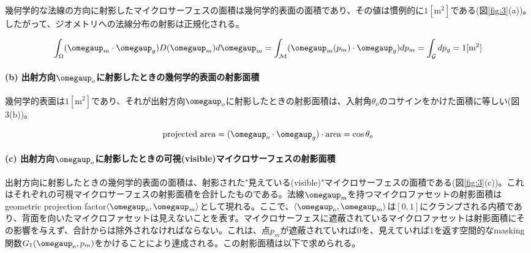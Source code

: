 \documentclass[a4paper,xelatex,ja=standard]{bxjsarticle}
\begin{document}
幾何学的な法線の方向に射影したマイクロサーフェスの面積は幾何学的表面の面積であり、その値は慣例的に$1 [\text{m}^2]$である(図\ref{fig:3}(a))。したがって、ジオメトリへの法線分布の射影は正規化される。

\begin{equation}
    \int_\Omega (\boldsymbol{\omegaup}_m \cdot \boldsymbol{\omegaup}_g) D(\boldsymbol{\omegaup}_m) d\boldsymbol{\omegaup}_m = \int_\mathcal{M} (\boldsymbol{\omegaup}_m(p_m) \cdot \boldsymbol{\omegaup}_g) dp_m = \int_\mathcal{G} dp_g = 1 [\text{m}^2]
    \label{eq:9}
\end{equation}

\paragraph{(b) 出射方向$\boldsymbol{\omegaup}_o$に射影したときの幾何学的表面の射影面積}

幾何学的表面は$1 [\text{m}^2]$であり、それが出射方向$\boldsymbol{\omegaup}_o$に射影したときの射影面積は、入射角$\theta_o$のコサインをかけた面積に等しい(図3(b))。

\begin{equation}
    \text{projected area} = (\boldsymbol{\omegaup}_o \cdot \boldsymbol{\omegaup}_g) \cdot \text{area} = \cos \theta_o
    \label{eq:10}
\end{equation}

\paragraph{(c) 出射方向$\boldsymbol{\omegaup}_o$に射影したときの可視(visible)マイクロサーフェスの射影面積}

出射方向に射影したときの幾何学的表面の面積は、射影された"見えている(visible)"マイクロサーフェスの面積である(図\ref{fig:3}(c))。これはそれぞれの可視マイクロサーフェスの射影面積を合計したものである。法線$\boldsymbol{\omegaup}_m$を持つマイクロファセットの射影面積はgeometric projection factor$\langle \boldsymbol{\omegaup}_o, \boldsymbol{\omegaup}_m \rangle$として現れる。ここで、$\langle \boldsymbol{\omegaup}_o, \boldsymbol{\omegaup}_m \rangle$は$[0, 1]$にクランプされる内積であり、背面を向いたマイクロファセットは見えないことを表す。マイクロサーフェスに遮蔽されているマイクロファセットは射影面積にその影響を与えず、合計からは除外されなければならない。これは、点$p_m$が遮蔽されていれば$0$を、見えていれば$1$を返す空間的なmasking関数$G_1(\boldsymbol{\omegaup}_o, p_m)$をかけることにより達成される。この射影面積は以下で求められる。
\end{document}
